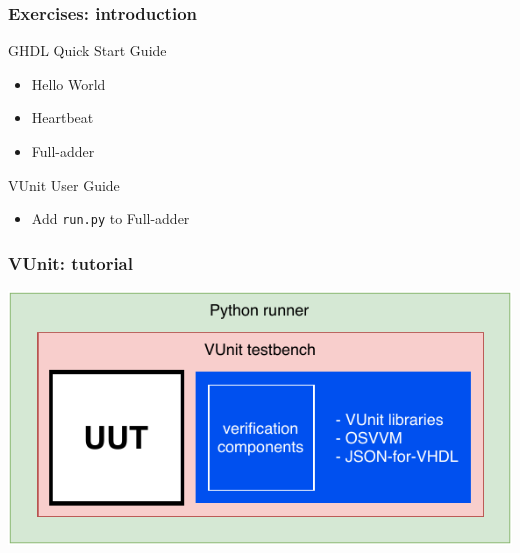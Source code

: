 \documentclass{beamer}
\begin{document}
\begin{frame}
\frametitle{Exercises: introduction}
GHDL Quick Start Guide \href{https://ghdl.readthedocs.io/en/latest/examples/quick_start/README.html}{\faBook}
\vspace{1em}
\begin{itemize}
  \item Hello World
  \href{https://ghdl.readthedocs.io/en/latest/examples/quick_start/hello/README.html}{\faBook}
  \vspace{1em}

  \item Heartbeat
  \href{https://ghdl.readthedocs.io/en/latest/examples/quick_start/heartbeat/README.html}{\faBook}
  \vspace{1em}

  \item Full-adder
  \href{https://ghdl.readthedocs.io/en/latest/examples/quick_start/adder/README.html}{\faBook}
\end{itemize}
\vspace{2em}

VUnit User Guide \href{http://vunit.github.io/user_guide.html}{\faBook}
\vspace{1em}
\begin{itemize}
  \item Add \lstinline{run.py} to Full-adder
\end{itemize}
\end{frame}

\begin{frame}
\frametitle{VUnit: tutorial}
\centering
\includegraphics[width=\linewidth]{vunit_overview.pdf}
\end{frame}
\end{document}
